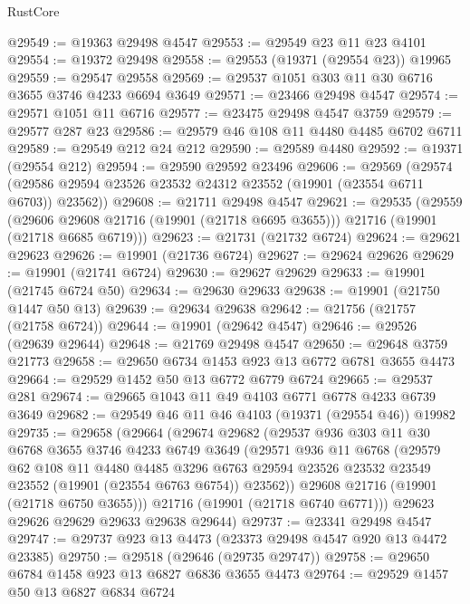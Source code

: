 \begin{lexlean}{RustCore}
\begin{coremodule}
@29549 := @19363 @29498 @4547
@29553 := @29549 @23 @11 @23 @4101
@29554 := @19372 @29498
@29558 := @29553 (@19371 (@29554 @23)) @19965
@29559 := @29547 @29558
@29569 := @29537 @1051 @303 @11 @30 @6716 @3655 @3746 @4233 @6694 @3649
@29571 := @23466 @29498 @4547
@29574 := @29571 @1051 @11 @6716
@29577 := @23475 @29498 @4547 @3759
@29579 := @29577 @287 @23
@29586 := @29579 @46 @108 @11 @4480 @4485 @6702 @6711
@29589 := @29549 @212 @24 @212
@29590 := @29589 @4480
@29592 := @19371 (@29554 @212)
@29594 := @29590 @29592 @23496
@29606 := @29569
    (@29574 (@29586 @29594 @23526 @23532 @24312 @23552 (@19901 (@23554 @6711 @6703)) @23562))
@29608 := @21711 @29498 @4547
@29621 := @29535
    (@29559
      (@29606 @29608 @21716 (@19901 (@21718 @6695 @3655)))
      @21716
      (@19901 (@21718 @6685 @6719)))
@29623 := @21731 (@21732 @6724)
@29624 := @29621 @29623
@29626 := @19901 (@21736 @6724)
@29627 := @29624 @29626
@29629 := @19901 (@21741 @6724)
@29630 := @29627 @29629
@29633 := @19901 (@21745 @6724 @50)
@29634 := @29630 @29633
@29638 := @19901 (@21750 @1447 @50 @13)
@29639 := @29634 @29638
@29642 := @21756 (@21757 (@21758 @6724))
@29644 := @19901 (@29642 @4547)
@29646 := @29526 (@29639 @29644)
@29648 := @21769 @29498 @4547
@29650 := @29648 @3759 @21773
@29658 := @29650 @6734 @1453 @923 @13 @6772 @6781 @3655 @4473
@29664 := @29529 @1452 @50 @13 @6772 @6779 @6724
@29665 := @29537 @281
@29674 := @29665 @1043 @11 @49 @4103 @6771 @6778 @4233 @6739 @3649
@29682 := @29549 @46 @11 @46 @4103 (@19371 (@29554 @46)) @19982
@29735 := @29658
    (@29664
      (@29674
        @29682
        (@29537
          @936
          @303
          @11
          @30
          @6768
          @3655
          @3746
          @4233
          @6749
          @3649
          (@29571
            @936
            @11
            @6768
            (@29579
              @62
              @108
              @11
              @4480
              @4485
              @3296
              @6763
              @29594
              @23526
              @23532
              @23549
              @23552
              (@19901 (@23554 @6763 @6754))
              @23562))
          @29608
          @21716
          (@19901 (@21718 @6750 @3655)))
        @21716
        (@19901 (@21718 @6740 @6771)))
      @29623
      @29626
      @29629
      @29633
      @29638
      @29644)
@29737 := @23341 @29498 @4547
@29747 := @29737 @923 @13 @4473 (@23373 @29498 @4547 @920 @13 @4472 @23385)
@29750 := @29518 (@29646 (@29735 @29747))
@29758 := @29650 @6784 @1458 @923 @13 @6827 @6836 @3655 @4473
@29764 := @29529 @1457 @50 @13 @6827 @6834 @6724

\end{coremodule}
\end{lexlean}
